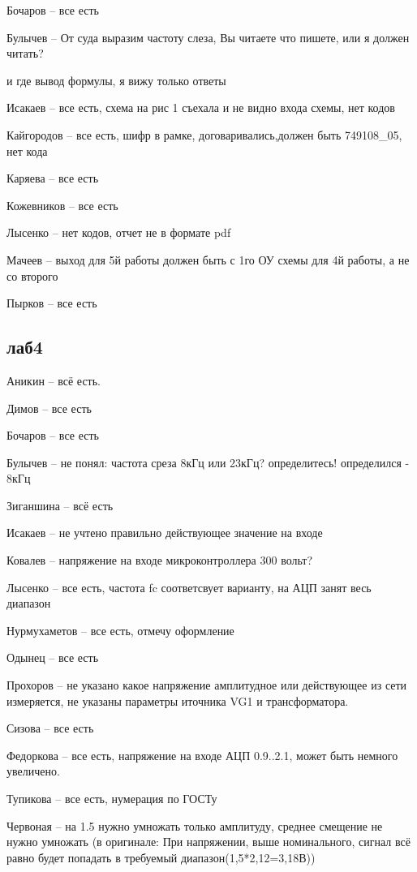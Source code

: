 \documentclass[a4paper,11pt]{article}
\begin{document}
Бочаров -- все есть

Булычев -- От суда выразим частоту слеза, Вы читаете что пишете, или я должен читать?

и где вывод формулы, я вижу только ответы

Исакаев -- все есть, схема на рис 1 съехала и не видно входа схемы, нет кодов

Кайгородов -- все есть, шифр в рамке, договаривались,должен быть 749108\_05, нет кода

Каряева -- все есть

Кожевников -- все есть

Лысенко -- нет кодов, отчет не в формате pdf

Мачеев -- выход для 5й работы должен быть с 1го ОУ схемы для 4й работы, а не со второго 

Пырков -- все есть

\newpage
\subsection*{лаб4}
Аникин -- всё есть.

Димов -- все есть

Бочаров -- все есть

Булычев -- не понял: частота среза 8кГц или 23кГц? определитесь! определился - 8кГц

Зиганшина -- всё есть

Исакаев -- не учтено правильно действующее значение на входе

Ковалев -- напряжение на входе микроконтроллера 300 вольт?

Лысенко -- все есть, частота fc соответсвует варианту, на АЦП занят весь диапазон

Нурмухаметов -- все есть, отмечу оформление

Одынец -- все есть

Прохоров -- не указано какое напряжение амплитудное или действующее из сети измеряется, не указаны параметры иточника VG1 и трансформатора.

Сизова -- все есть

Федоркова -- все есть, напряжение на входе АЦП 0.9..2.1, может быть немного увеличено.

Тупикова -- все есть, нумерация по ГОСТу

Червоная -- на 1.5 нужно умножать только амплитуду, среднее смещение не нужно умножать 
(в оригинале: При напряжении, выше номинального, сигнал всё равно будет попадать в требуемый диапазон(1,5*2,12=3,18В))
\end{document}
